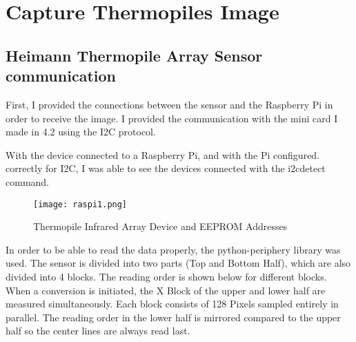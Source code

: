 \documentclass[thesis]{deutez}
\begin{document}
\section{Capture Thermopiles Image}
\subsection{Heimann Thermopile Array Sensor communication}
First, I provided the connections between the sensor and the Raspberry Pi in order to receive the image. I provided the communication with the mini card I made in 4.2 using the I2C protocol.

With the device connected to a Raspberry Pi, and with the Pi configured.\cite{adaf} correctly for I2C, I was able to see the devices connected with the i2cdetect command.
\begin{figure}[h!]
	\centering
	\texttt{[image: raspi1.png]}
	\caption{Thermopile Infrared Array Device and EEPROM Addresses}
\end{figure}
\FloatBarrier

In order to be able to read the data properly, the python-periphery\cite{perip} library was used. The sensor is divided into two parts (Top and Bottom Half), which are also divided into 4 blocks. The reading order is shown below for different blocks. When a conversion is initiated, the X Block of the upper and lower half are measured simultaneously. Each block consists of 128 Pixels sampled entirely in parallel. The reading order in the lower half is mirrored compared to the upper half so the center lines are always read last.
\end{document}
